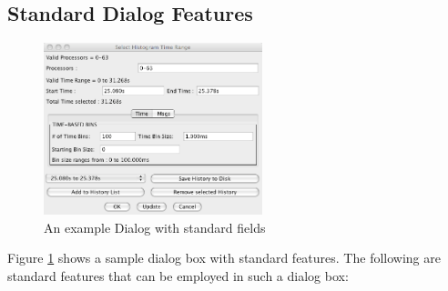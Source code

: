 \documentclass[10pt]{report}
\begin{document}
\subsection{Standard Dialog Features}

\begin{figure}[htb]
\center
\includegraphics[width=2.5in]{fig/standard_dialog}
\caption{An example Dialog with standard fields}
\label{standard dialog}
\end{figure}

Figure \ref{standard dialog} shows a sample dialog box with standard
features. The following are standard features that can be employed in
such a dialog box:
\end{document}
